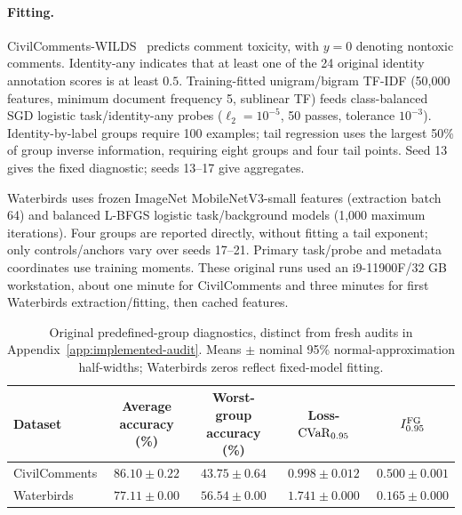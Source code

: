 \paragraph{Fitting.}
CivilComments-WILDS~\citep{borkan2019nuanced,koh2021wilds} predicts comment toxicity, with $y=0$ denoting nontoxic comments. Identity-any indicates that at least one of the 24 original identity annotation scores is at least $0.5$. Training-fitted unigram/bigram TF-IDF (50,000 features, minimum document frequency 5, sublinear TF) feeds class-balanced SGD logistic task/identity-any probes ($\ell_2=10^{-5}$, 50 passes, tolerance $10^{-3}$). Identity-by-label groups require 100 examples; tail regression uses the largest 50\% of group inverse information, requiring eight groups and four tail points. Seed 13 gives the fixed diagnostic; seeds 13--17 give aggregates.

Waterbirds uses frozen ImageNet MobileNetV3-small features (extraction batch 64) and balanced L-BFGS logistic task/background models (1,000 maximum iterations). Four groups are reported directly, without fitting a tail exponent; only controls/anchors vary over seeds 17--21. Primary task/probe and metadata coordinates use training moments. These original runs used an i9-11900F/32 GB workstation, about one minute for CivilComments and three minutes for first Waterbirds extraction/fitting, then cached features.

\begin{table}[htbp]
\centering\small
\setlength{\tabcolsep}{3pt}
\caption{Original predefined-group diagnostics, distinct from fresh audits in Appendix~\ref{app:implemented-audit}. Means $\pm$ nominal 95\% normal-approximation half-widths; Waterbirds zeros reflect fixed-model fitting.}
\label{tab:d-predefined-diagnostics}
\begin{tabular}{@{}lcccc@{}}
\toprule
Dataset & \shortstack{Average\\accuracy (\%)} & \shortstack{Worst-group\\accuracy (\%)} & \shortstack{Loss-\\$\operatorname{CVaR}_{0.95}$} & $I_{0.95}^{\mathrm{FG}}$ \\
\midrule
CivilComments & $86.10\pm0.22$ & $43.75\pm0.64$ & $0.998\pm0.012$ & $0.500\pm0.001$ \\
Waterbirds & $77.11\pm0.00$ & $56.54\pm0.00$ & $1.741\pm0.000$ & $0.165\pm0.000$ \\
\bottomrule
\end{tabular}
\par\smallskip
\end{table}


